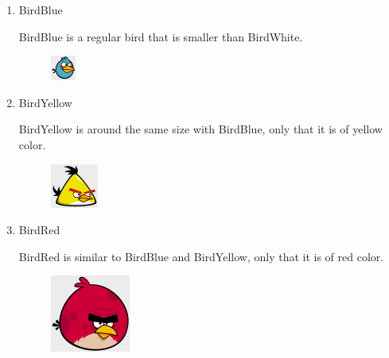 \documentclass{dalthesis}
\begin{document}
\begin{enumerate}
\begin{enumerate}
\begin{enumerate}
      \item BirdBlue

      BirdBlue is a regular bird that is smaller than BirdWhite.

      \begin{figure}[H]
        \includegraphics[width=.5\textwidth,keepaspectratio]{birds/blue.png}
      \end{figure}

      \item BirdYellow

      BirdYellow is around the same size with BirdBlue, only that it is of yellow color.

      \begin{figure}[H]
        \includegraphics[width=.5\textwidth,keepaspectratio]{birds/yellow.png}
      \end{figure}

      \item BirdRed

      BirdRed is similar to BirdBlue and BirdYellow, only that it is of red color.

      \begin{figure}[H]
        \includegraphics[width=.5\textwidth,keepaspectratio]{birds/red.png}
      \end{figure}


\end{enumerate}
\end{enumerate}
\end{enumerate}
\end{document}
